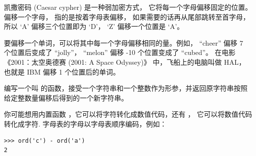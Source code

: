 \begin{exercise}
  

\label{exrotate}

凯撒密码 (Caesar cypher) 是一种弱加密方式， 它将每一个字母偏移固定的位置。 偏移一个字母， 指的是按着字母表偏移， 如果需要的话再从尾部跳转至首字母， 所以 `A' 偏移三个位置即为 `D'， `Z' 偏移一个位置是 `A'。


要偏移一个单词，可以将其中每一个字母偏移相同的量。例如， ``cheer'' 偏移 7 个位置后变成了 ``jolly''， ``melon'' 偏移 -10 个位置变成了 ``cubed''。 在电影 《2001：太空奥德赛 (2001: A Space Odyssey)》 中，飞船上的电脑叫做 HAL，也就是 IBM 偏移 1 个位置后的单词。



编写一个叫  的函数，接受一个字符串和一个整数作为形参，并返回原字符串按照给定整数量偏移后得到的一个新字符串。


你可能想用内置函数  ，它可以将字符转化成数值代码，还有 ， 它可以将数值代码转化成字符. 字母表的字母以字母表顺序编码，例如：

\begin{lstlisting}
>>> ord('c') - ord('a')
2
\end{lstlisting}



\end{exercise}

